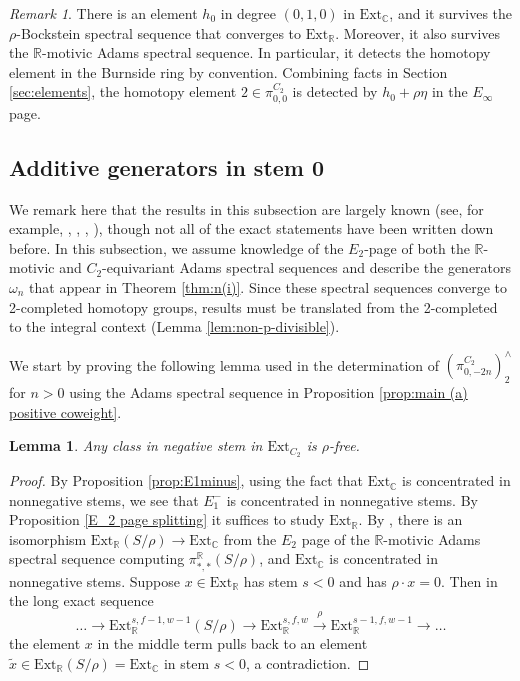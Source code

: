 \documentclass[psamsfonts]{amsart}
\makeatletter
\newcommand{\C}{\mathbb C}
\newcommand{\Ext}{\mathrm {Ext}}
\newtheorem{lemma}[theorem]{Lemma}
\theoremstyle{definition}
\theoremstyle{remark}
\newtheorem{remark}[theorem]{Remark}
\newcommand{\R}{\mathbb{R}}
\newcommand{\too}[1]{\overset{#1}\to}
\newcommand{\switchmargin}{
\if@reversemargin
\normalmarginpar
\else
\reversemarginpar
\fi
}
\newcommand{\highlighteva}[1]{\ifmmode{\text{\sethlcolor{Lavender}\hl{$#1$}}}\else{\sethlcolor{Lavender}\hl{#1}}\fi}
\newcommand{\EvaNoteHl}[2]{\marginnote{\smaller \smaller \color{Periwinkle}
#2}{\highlighteva{#1}}\switchmargin}
\numberwithin{equation}{section}
\makeatother
\begin{document}
\begin{remark}
There is an element $h_0$ in degree $(0,1,0)$ in $\Ext_\C$, and it survives the
$\rho$-Bockstein spectral sequence that converges to $\Ext_\R$. Moreover, it
also survives the $\R$-motivic Adams spectral sequence. In particular, it
detects the homotopy element 
in the Burnside ring by convention. Combining facts in Section \ref{sec:elements}, the homotopy element $2\in \pi_{0,0}^{C_2}$ is detected by $h_0+\rho\eta$ in the $E_\infty$ page.
\end{remark}

\subsection{Additive generators in stem 0}
We remark here that the results in this subsection are largely known (see, for example, \cite{BI}, \cite{BI2}, \cite{DI}, \cite{H}), though not all of the exact statements have been written down before. In this subsection, we assume knowledge of the $E_2$-page of both the $\R$-motivic and $C_2$-equivariant Adams spectral sequences and describe the generators $\omega_n$ that appear in Theorem \ref{thm:n(i)}.
Since these spectral sequences converge to 2-completed homotopy groups, results must be translated from the 2-completed to the integral context (Lemma \ref{lem:non-p-divisible}).

We start by proving the following lemma used in the determination of $(\pi^{C_2}_{0,-2n})^\wedge_2$ for $n>0$ using the Adams spectral sequence
in Proposition \ref{prop:main (a) positive coweight}.
\begin{lemma}\label{3.4}
Any class in negative stem in $\Ext_{C_2}$ is $\rho$-free.
\end{lemma}
\begin{proof}
By Proposition \ref{prop:E1minus}, using the fact that $\Ext_\C$ is concentrated in nonnegative stems, we see that $E_1^-$ is concentrated in nonnegative stems. By Proposition \ref{E_2 page splitting} it suffices to study $\Ext_\R$.
By \cite[Proposition 3.1]{BI}, there is an isomorphism $\Ext_\R(S/\rho)\to
\Ext_\C$ from the $E_2$ page of the $\R$-motivic Adams spectral sequence computing $\pi_{*,*}^\R(S/\rho)$, and $\Ext_\C$ is concentrated in nonnegative stems.
Suppose $x\in \Ext_\R$ has stem $s < 0$ and has $\rho \cdot x = 0$. Then in
the long exact sequence
$$ \dots \to \Ext_\R^{s,f-1,w-1}(S/\rho)\to \Ext_\R^{s,f,w}\too{\rho}
\Ext_\R^{s-1,f,w-1} \to \dots $$
the element $x$ in the middle term pulls back to an element $\tilde{x}\in \Ext_\R(S/\rho) =
\Ext_\C$ in stem $s < 0$, a contradiction.
\end{proof}
\end{document}
